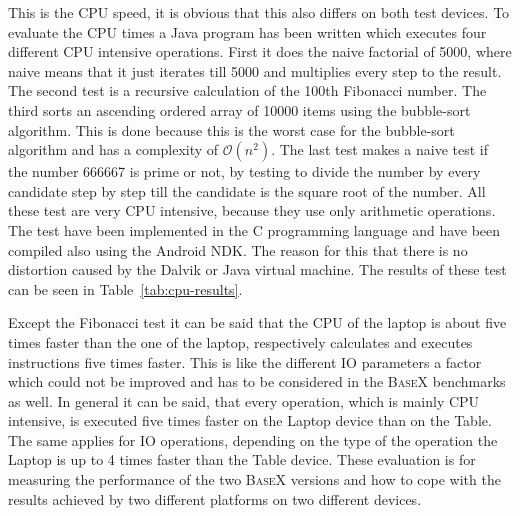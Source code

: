 This is the CPU speed, it is obvious that this also differs on both test devices.
To evaluate the CPU times a Java program has been written which executes four different CPU intensive operations.
First it does the naive factorial of 5000, where naive means that it just iterates till 5000 and multiplies every step to the result.
The second test is a recursive calculation of the 100th Fibonacci number.
The third sorts an ascending ordered array of 10000 items using the bubble-sort algorithm.
This is done because this is the worst case for the bubble-sort algorithm and has a complexity of $\mathcal O(n^2)$.
The last test makes a naive test if the number 666667 is prime or not, by testing to divide the number by every candidate step by step till the candidate is the square root of the number.
All these test are very CPU intensive, because they use only arithmetic operations.
The test have been implemented in the C programming language and have been compiled also using the Android NDK.
The reason for this that there is no distortion caused by the Dalvik or Java virtual machine.
The results of these test can be seen in Table~\ref{tab:cpu-results}.

Except the Fibonacci test it can be said that the CPU of the laptop is about five times faster than the one of the laptop, respectively calculates and executes instructions five times faster.
This is like the different IO parameters a factor which could not be improved and has to be considered in the \textsc{BaseX} benchmarks as well.
In general it can be said, that every operation, which is mainly CPU intensive, is executed five times faster on the Laptop device than on the Table.
The same applies for IO operations, depending on the type of the operation the Laptop is up to  4 times faster than the Table device.
These evaluation is for measuring the performance of the two \textsc{BaseX} versions and how to cope with the results achieved by two different platforms on two different devices.

